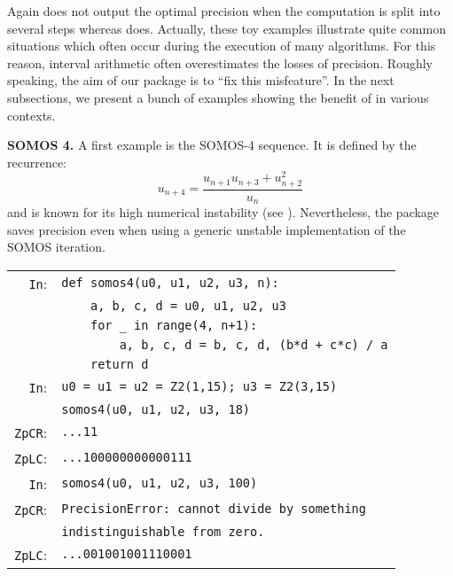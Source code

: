 \documentclass[sigconf]{acmart}
\newcommand{\ZpCR}{\text{\color{output} \rm \tt ZpCR}\xspace}
\newcommand{\ZpL}{\text{\color{output} \rm \tt ZpL}\xspace}
\newcommand{\cIn}{{\color{input} \tt \phantom{Zp}In}:}
\newcommand{\cZpCR}{{\color{output} \tt ZpCR}:}
\newcommand{\cZpFP}{{\color{output} \tt ZpFP}:}
\newcommand{\cZpLC}{{\color{output} \tt ZpLC}:}
\theoremstyle{definition}
\begin{document}
\smallskip

\noindent
Again \ZpCR does not output the optimal precision when the computation
is split into several steps whereas \ZpL does.
Actually, these toy examples illustrate quite common situations which 
often occur during the execution of many algorithms. For this reason,
interval arithmetic often overestimates the losses of precision. 
Roughly speaking, the aim of our package is to ``fix this misfeature''.
In the next subsections, we present a bunch of examples showing the
benefit of \ZpL in various contexts.

\medskip

\noindent \textbf{SOMOS 4.}
%
A first example is the SOMOS-4 sequence. It is defined by the recurrence: 
$$u_{n+4} = \frac{u_{n+1} u_{n+3} + u_{n+2}^2}{u_n}$$
and is known for its high numerical instability (see 
\cite{caruso-roe-vaccon:14a}). Nevertheless, the \ZpL package saves 
precision even when using a generic unstable implementation of the SOMOS 
iteration.

\smallskip

{\noindent \small
\begin{tabular}{rl}
\cIn
 & {\color{keyword}\verb?def?}\verb? ?{\color{function}\verb?somos4?}\verb?(u0, u1, u2, u3, n):? \\
 & \verb?    a, b, c, d = u0, u1, u2, u3? \\
 & \verb?    ?{\color{keyword}\verb?for?}\verb? _ in ?{\color{keyword}\verb?range?}\verb?(4, n+1):? \\
 & \verb?        a, b, c, d = b, c, d, (b*d + c*c) / a? \\
 & \verb?    ?{\color{keyword}\verb?return?}\verb? d? \\
\cIn
 & \verb?u0 = u1 = u2 = ?{\color{ring}\verb?Z2?}\verb?(1,15); u3 = ?{\color{ring}\verb?Z2?}\verb?(3,15)? \\
 & {\color{function}\verb?somos4?}\verb?(u0, u1, u2, u3, 18)? \\
\cZpCR
 & \verb?...11? \\
\cZpLC
 & \verb?...100000000000111? \\
\cIn
 & {\color{function}\verb?somos4?}\verb?(u0, u1, u2, u3, 100)? \\
\cZpCR
 & {\color{error}\verb?PrecisionError?}\verb?: cannot divide by something?\\
 &\verb?indistinguishable from zero.? \\
\cZpLC
 & \verb?...001001001110001? \\
\end{tabular}}
\end{document}
